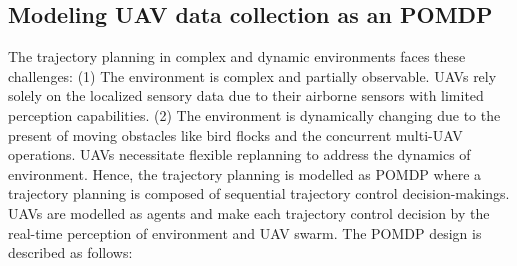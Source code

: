 \documentclass[journal]{IEEEtran}
\begin{document}
\subsection{Modeling UAV data collection as an POMDP} \label{sec_pomdp}

The trajectory planning in complex and dynamic environments faces these challenges: (1) The environment is complex and partially observable. UAVs rely solely on the localized sensory data due to their airborne sensors with limited perception capabilities. (2) The environment is dynamically changing due to the present of moving obstacles like bird flocks and the concurrent multi-UAV operations. UAVs necessitate flexible replanning to address the dynamics of environment. 
Hence, the trajectory planning is modelled as POMDP where a trajectory planning is composed of sequential trajectory control decision-makings. UAVs are modelled as agents and make each trajectory control decision by the real-time perception of environment and UAV swarm. The POMDP design is described as follows: 
\end{document}
